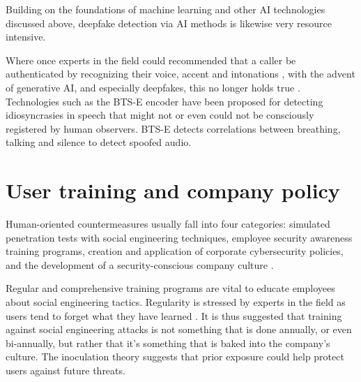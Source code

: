 Building on the foundations of machine learning and other AI technologies discussed above, deepfake detection via AI methods is likewise very resource intensive.

Where once experts in the field could recommended that a caller be authenticated by recognizing their voice, accent and intonations \citep{mitnickArtDeceptionControlling2003}, with the advent of generative AI, and especially deepfakes, this no longer holds true \citep{doanBTSEAudioDeepfakeDetectiong2023}. Technologies such as the BTS-E encoder have been proposed for detecting idiosyncrasies in speech that might not or even could not be consciously registered by human observers. BTS-E detects correlations between breathing, talking and silence to detect spoofed audio.


















\section{User training and company policy}
\begin{comment}
    
    - The best defense against SE attacks is an educated, conscious user
    - User education should be continuous and not a one-off event

\end{comment}

Human-oriented countermeasures usually fall into four categories: simulated penetration tests with social engineering techniques, employee security awareness training programs, creation and application of corporate cybersecurity policies, and the development of a security-conscious company culture \citep{tsinganosTowardsAnAutomatedRecognitionSystem2018, mitnickArtDeceptionControlling2003}.

Regular and comprehensive training programs are vital to educate employees about social engineering tactics. Regularity is stressed by experts in the field as users tend to forget what they have learned \citep{hadnagySocialEngineering2018, mitnickArtDeceptionControlling2003}. It is thus suggested that training against social engineering attacks is not something that is done annually, or even bi-annually, but rather that it's something that is baked into the company's culture. The inoculation theory \citep{blauthArtificialIntelligenceCrime2022} suggests that prior exposure could help protect users against future threats.

